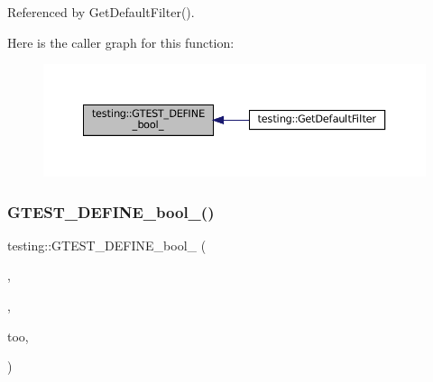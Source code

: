 Referenced by Get\+Default\+Filter().

Here is the caller graph for this function\+:
\nopagebreak
\begin{figure}[H]
\begin{center}
\leavevmode
\includegraphics[width=350pt]{namespacetesting_a428e5944490e497df683cb8324ce4489_icgraph}
\end{center}
\end{figure}
\mbox{\label{namespacetesting_ad72f215c805a46fba44cb09d717b01ef}} 
\subsubsection{\texorpdfstring{G\+T\+E\+S\+T\+\_\+\+D\+E\+F\+I\+N\+E\+\_\+bool\+\_\+()}{GTEST\_DEFINE\_bool\_()}\hspace{0.1cm}{\footnotesize\ttfamily [2/9]}}
{\footnotesize\ttfamily testing\+::\+G\+T\+E\+S\+T\+\_\+\+D\+E\+F\+I\+N\+E\+\_\+bool\+\_\+ (\begin{DoxyParamCaption}\item[{also\+\_\+run\+\_\+disabled\+\_\+tests}]{,  }\item[{\hyperlink{namespacetesting_1_1internal_a67132cdce23fb71b6c38ee34ef81eb4c}{internal\+::\+Bool\+From\+G\+Test\+Env}(\char`\"{}also\+\_\+run\+\_\+disabled\+\_\+tests\char`\"{}, false)}]{,  }\item[{\char`\"{}Run disabled tests}]{too,  }\item[{in addition to the tests normally being run.\char`\"{}}]{ }\end{DoxyParamCaption})}

\mbox{\label{namespacetesting_a5ab9e9cc2ee1addddfb2f4b43dd4e402}} 
